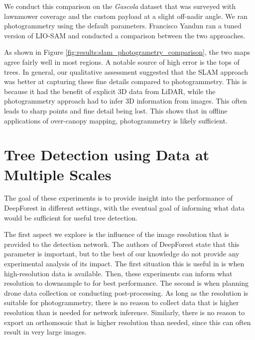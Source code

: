 We conduct this comparison on the \textit{Gascola} dataset that was surveyed with lawnmower coverage and the custom payload at a slight off-nadir angle. We ran photogrammetry using the default parameters. Francisco Yandun ran a tuned version of LIO-SAM \cite{Shan2020LIO-SAM:Mapping} and conducted a comparison between the two approaches.

As shown in Figure \ref{fig:results:slam_photogrametry_comparison}, the two maps agree fairly well in most regions. A notable source of high error is the tops of trees. In general, our qualitative assessment suggested that the SLAM approach was better at capturing these fine details compared to photogrammetry. This is because it had the benefit of explicit 3D data from LiDAR, while the photogrammetry approach had to infer 3D information from images. This often leads to sharp points and fine detail being lost. This shows that in offline applications of over-canopy mapping, photogrammetry is likely sufficient. 

\section{Tree Detection using Data at Multiple Scales}
The goal of these experiments is to provide insight into the performance of DeepForest in different settings, with the eventual goal of informing what data would be sufficient for useful tree detection.

The first aspect we explore is the influence of the image resolution that is provided to the detection network. The authors of DeepForest state that this parameter is important, but to the best of our knowledge do not provide any experimental analysis of its impact. The first situation this is useful in is when high-resolution data is available. Then, these experiments can inform what resolution to downsample to for best performance. The second is when planning drone data collection or conducting post-processing. As long as the resolution is suitable for photogrammetry, there is no reason to collect data that is higher resolution than is needed for network inference. Similarly, there is no reason to export an orthomosaic that is higher resolution than needed, since this can often result in very large images. 



